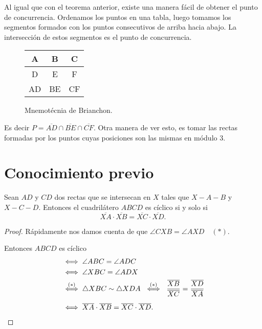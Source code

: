 \begin{remark.tcb}
    Al igual que con el teorema anterior, existe una manera fácil de obtener el punto de concurrencia.
    Ordenamos los puntos en una tabla, luego tomamos los segmentos formados con los puntos consecutivos de arriba hacia abajo.
    La intersección de estos segmentos es el punto de concurrencia.
    \begin{figure}[H]
        \centering
        \begin{tabular}{|c|c|c|}
            \hline
            A & B & C\\\hline
            D & E & F\\
            \hline \hline
            AD & BE & CF \\
            \hline
        \end{tabular}
        \caption{Mnemotécnia de Brianchon.}
    \end{figure}
    Es decir $P = \overline{AD} \cap \overline{BE} \cap \overline{CF}$.
    Otra manera de ver esto, es tomar las rectas formadas por los puntos cuyas posiciones son las mismas en módulo 3.
\end{remark.tcb}



\section{Conocimiento previo}

\begin{section-property}\label{power-external-point}
Sean $AD$ y $CD$ dos rectas que se intersecan en $X$ tales que $X - A - B$ y $X - C - D$.
Entonces el cuadrilátero $ABCD$ es cíclico si y solo si
\[
    \overline{XA} \cdot \overline{XB} = \overline{XC} \cdot \overline{XD}.
\]
\end{section-property}

\begin{multicols}{2}
    \begin{proof}
        Rápidamente nos damos cuenta de que $\angle CXB = \angle AXD\quad (\ast).$

        Entonces $ABCD$ es cíclico
        \begin{align*}
            &\iff \angle ABC = \angle ADC\\
            &\iff \angle XBC = \angle ADX\\
            &\overset{(\ast)}{\iff} \triangle XBC \sim \triangle XDA \ \overset{(\ast)}{\iff} \ \frac{\overline{XB}}{\overline{XC}} = \frac{\overline{XD}}{\overline{XA}}\\[2mm]
            &\iff \overline{XA} \cdot \overline{XB} = \overline{XC} \cdot \overline{XD}. \qedhere
        \end{align*}
    \end{proof}
    \begin{figure}[H]
        \centering
        
    \end{figure}
\end{multicols}




